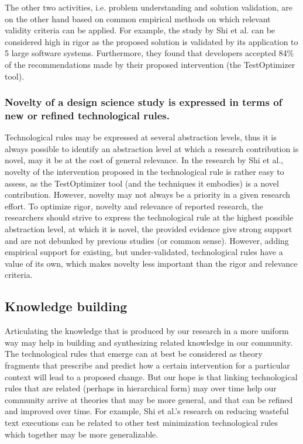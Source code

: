 \documentclass[graybox]{svmult}
\begin{document}
The other two activities, i.e. problem understanding and solution validation, are on the other hand based on common empirical methods on which relevant validity criteria can be applied. For example, the study by Shi et al. can be considered high in rigor as the proposed solution is validated by its application to 5 large software systems.  Furthermore, they found that developers accepted 84\% of the recommendations made by their proposed intervention (the TestOptimizer tool). 

\subsubsection{Novelty of a design science study is expressed in terms of new or refined technological rules.} Technological rules may be expressed at several abstraction levels, thus it is always possible to identify an abstraction level at which a research contribution is novel, may it be at the cost of general relevance.  In the research by Shi et al., novelty of the intervention proposed in the technological rule is rather easy to assess, as the TestOptimizer tool (and the techniques it embodies) is a novel contribution.  
However, novelty may not always be a priority in a given research effort.
To optimize rigor, novelty and relevance of reported research, the researchers should strive to express the technological rule at the highest possible abstraction level, at which it is novel, the provided evidence give strong support and are not debunked by previous studies (or common sense). However, adding empirical support for existing, but under-validated, technological rules have a value of its own, which makes novelty less important than the rigor and relevance criteria.


\subsection{Knowledge building}
\label{sec:knowledge}

Articulating the knowledge that is produced by our research in a more uniform way may help in building and synthesizing related knowledge in our community. 
The technological rules that emerge can at best be considered as theory fragments that prescribe and predict how a certain intervention for a particular context will lead to a proposed change. 
But our hope is that linking technological rules that are related (perhaps in hierarchical form) may over time help our community arrive at theories that may be more general, and that can be refined and improved over time. 
For example, Shi et al.'s research on reducing wasteful text executions can be related to other test minimization technological rules which together may be more generalizable. 
\end{document}

